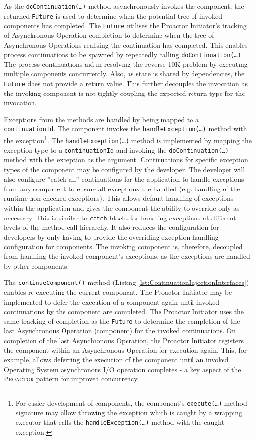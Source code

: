 \documentclass[prodmode]{style/acmlarge}
\begin{document}
As the \texttt{doContinuation(\ldots)} method asynchronously invokes the
component, the returned \texttt{Future} is used to determine when the potential
tree of invoked components has completed.  The \texttt{Future} utilises the
Proactor Initiator's tracking of Asynchronous Operation completion to determine
when the tree of Asynchronous Operations realising the continuation has
completed.  This enables process continuations \cite{process-continuation} to be
spawned by repeatedly calling \texttt{doContinuation(\ldots)}.  The process
continuations aid in resolving the reverse 10K problem
\cite{reverse-ten-k-problem} by executing multiple components concurrently.
Also, as state is shared by dependencies, the \texttt{Future} does not provide a
return value.  This further decouples the invocation as the invoking component
is not tightly coupling the expected return type for the invocation.

Exceptions from the methods are handled by being mapped to a
\texttt{continuationId}.  The component invokes the
\texttt{handle\-Excep\-tion(\ldots)} method with the exception\footnote{For
easier development of components, the component's \texttt{execute(\ldots)}
method signature may allow throwing the exception which is caught by a wrapping
executor that calls the \texttt{handleException(\ldots)} method with the caught
exception.}.  The \texttt{handleException(\ldots)} method is implemented by
mapping the exception type to a \texttt{continuationId} and invoking the
\texttt{doContinuation(\ldots)} method with the exception as the argument. 
Continuations for specific exception types of the component may be configured by
the developer.  The developer will also configure ''catch all'' continuations
for the application to handle exceptions from any component to ensure all
exceptions are handled (e.g. handling of the runtime non-checked exceptions). 
This allows default handling of exceptions within the application and gives the
component the ability to override only as necessary.  This is similar to
\texttt{catch} blocks for handling exceptions at different levels of the method
call hierarchy.  It also reduces the configuration for developers by only having
to provide the overriding exception handling configuration for components.  The
invoking component is, therefore, decoupled from handling the invoked
component's exceptions, as the exceptions are handled by other components.

The \texttt{continueComponent()} method (Listing
\ref{lst:ContinuationInjectionInterfaces}) enables re-executing the current
component.  The Proactor Initiator may be implemented to defer the execution of
a component again until invoked continuations by the component are completed. 
The Proactor Initiator uses the same tracking of completion as the
\texttt{Future} to determine the completion of the last Asynchronous Operation
(component) for the invoked continuations.  On completion of the last
Asynchronous Operation, the Proactor Initiator registers the component within an
Asynchronous Operation for execution again.  This, for example, allows deferring
the execution of the component until an invoked Operating System asynchronous
I/O operation completes - a key aspect of the \textsc{Proactor} pattern for
improved concurrency.
\end{document}
